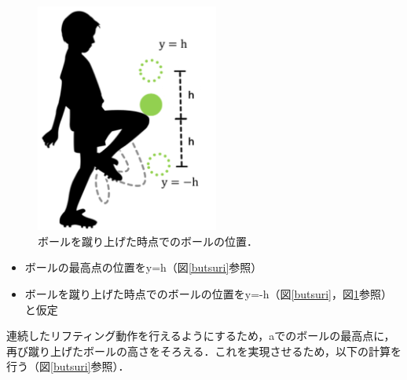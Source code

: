 \vspace{1.5cm}

\begin{figure}[htbp]
    \centering
    \includegraphics[width=6cm]{image/ballenzan.png}
    \caption[ボールを蹴り上げた時点でのボールの位置]{ボールを蹴り上げた時点でのボールの位置．}
  \label{enzan}
\end{figure}

\vspace{1cm}


\begin{itemize}
    \item ボールの最高点の位置をy=h（図\ref{butsuri}参照）
    \item ボールを蹴り上げた時点でのボールの位置をy=-h（図\ref{butsuri}，図\ref{enzan}参照）と仮定
\end{itemize}


連続したリフティング動作を行えるようにするため，aでのボールの最高点に，
再び蹴り上げたボールの高さをそろえる．これを実現させるため，以下の計算を行う（図\ref{butsuri}参照）．


